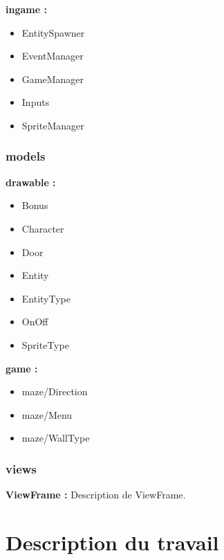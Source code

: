 \documentclass[a4paper]{article}
\begin{document}
\textbf{ingame :} \begin{itemize}
	\item{EntitySpawner}
	\item{EventManager}
	\item{GameManager}
	\item{Inputs}
	\item{SpriteManager}
\end{itemize}

\subsubsection{models}
\textbf{drawable :} \begin{itemize}
	\item{Bonus}
	\item{Character}
	\item{Door}
	\item{Entity}
	\item{EntityType}
	\item{OnOff}
	\item{SpriteType}
\end{itemize}

\textbf{game :} \begin{itemize}
	\item{maze/Direction}
	\item{maze/Menu}
	\item{maze/WallType}
\end{itemize}

\subsubsection{views}
\textbf{ViewFrame :} Description de ViewFrame.


\section*{} %
\section{Description du travail}
\end{document}
